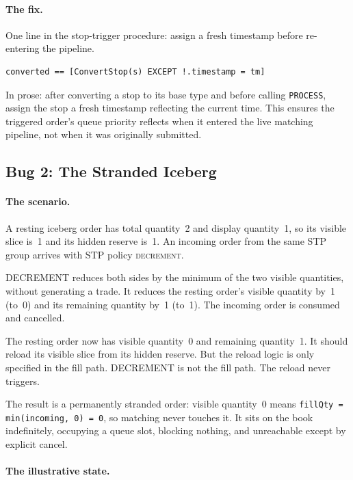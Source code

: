 \documentclass[11pt,a4paper]{article}
\begin{document}
\paragraph{The fix.} One line in the stop-trigger procedure: assign a
fresh timestamp before re-entering the pipeline.

\begin{lstlisting}[language=tlaplus]
converted == [ConvertStop(s) EXCEPT !.timestamp = tm]
\end{lstlisting}

In prose: after converting a stop to its base type and before calling
\texttt{PROCESS}, assign the stop a fresh timestamp reflecting the
current time. This ensures the triggered order's queue priority reflects
when it entered the live matching pipeline, not when it was originally
submitted.

\subsection{Bug 2: The Stranded Iceberg}
\label{sec:bug2}

\paragraph{The scenario.} A resting iceberg order has total quantity~2
and display quantity~1, so its visible slice is~1 and its hidden
reserve is~1. An incoming order from the same STP group arrives with
STP policy \textsc{decrement}.

DECREMENT reduces both sides by the minimum of the two visible
quantities, without generating a trade. It reduces the resting order's
visible quantity by~1 (to~0) and its remaining quantity by~1 (to~1).
The incoming order is consumed and cancelled.

The resting order now has visible quantity~0 and remaining quantity~1.
It should reload its visible slice from its hidden reserve. But the
reload logic is only specified in the fill path. DECREMENT is not the
fill path. The reload never triggers.

The result is a permanently stranded order: visible quantity~0 means
\texttt{fillQty = min(incoming, 0) = 0}, so matching never touches it.
It sits on the book indefinitely, occupying a queue slot, blocking
nothing, and unreachable except by explicit cancel.

\paragraph{The illustrative state.}
\end{document}
